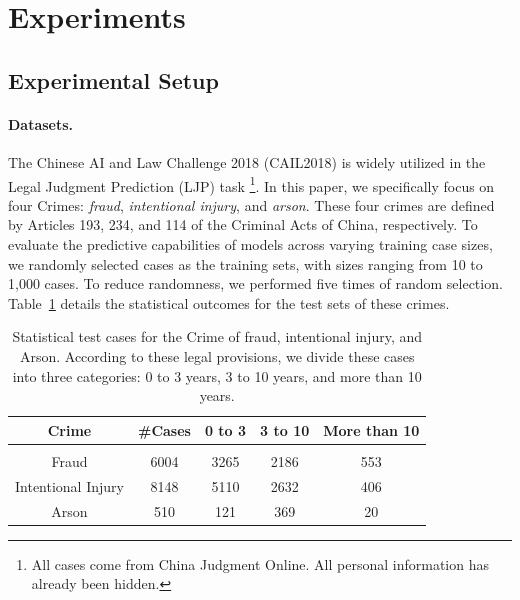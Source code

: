 \section{Experiments}




\subsection{Experimental Setup} \label{es}
\paragraph{Datasets.} The Chinese AI and Law Challenge 2018 (CAIL2018) is widely utilized in the Legal Judgment Prediction (LJP) task \cite{DBLP:journals/corr/abs-1807-02478}\footnote{All cases come from China Judgment Online. All personal information has already been hidden.}. In this paper, we specifically focus on four Crimes: \textit{fraud}, \textit{intentional injury}, and \textit{arson}. These four crimes are defined by Articles 193, 234, and 114 of the Criminal Acts of China, respectively. To evaluate the predictive capabilities of models across varying training case sizes, we randomly selected cases as the training sets, with sizes ranging from 10 to 1,000 cases. To reduce randomness, we performed five times of random selection. Table~\ref{tab:test} details the statistical outcomes for the test sets of these crimes.

\begin{table}
    \centering
    \scriptsize
    \caption{Statistical test cases for the Crime of fraud, intentional injury, and Arson. 
    According to these legal provisions, we divide these cases into three categories: 0 to 3 years, 3 to 10 years, and more than 10 years.}
    \begin{tabular}{ccccc}
    \toprule
      Crime & \#Cases & 0 to 3 & 3 to 10&More than 10\\
      \hline \vspace{-2mm} \\
    Fraud & 6004 & 3265 & 2186 & 553\\
    Intentional Injury & 8148 & 5110 & 2632 & 406\\
    Arson & 510 & 121 & 369 & 20\\
    \bottomrule
    \end{tabular}
    \label{tab:test}
\end{table}

